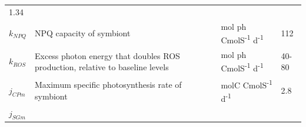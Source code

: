 \documentclass[]{elsarticle} %
\begin{document}
\begin{longtable}[c]{@{}llll@{}}
\begin{minipage}[t]{0.10\columnwidth}
1.34
\strut\end{minipage}\tabularnewline
\begin{minipage}[t]{0.10\columnwidth}\raggedright\strut
\(k_{NPQ}\)
\strut\end{minipage} &
\begin{minipage}[t]{0.48\columnwidth}\raggedright\strut
NPQ capacity of symbiont
\strut\end{minipage} &
\begin{minipage}[t]{0.25\columnwidth}\raggedright\strut
mol ph CmolS\textsuperscript{-1} d\textsuperscript{-1}
\strut\end{minipage} &
\begin{minipage}[t]{0.10\columnwidth}\raggedright\strut
112
\strut\end{minipage}\tabularnewline
\begin{minipage}[t]{0.10\columnwidth}\raggedright\strut
\(k_{ROS}\)
\strut\end{minipage} &
\begin{minipage}[t]{0.48\columnwidth}\raggedright\strut
Excess photon energy that doubles ROS production, relative to baseline
levels
\strut\end{minipage} &
\begin{minipage}[t]{0.25\columnwidth}\raggedright\strut
mol ph CmolS\textsuperscript{-1} d\textsuperscript{-1}
\strut\end{minipage} &
\begin{minipage}[t]{0.10\columnwidth}\raggedright\strut
40-80
\strut\end{minipage}\tabularnewline
\begin{minipage}[t]{0.10\columnwidth}\raggedright\strut
\(j_{CPm}\)
\strut\end{minipage} &
\begin{minipage}[t]{0.48\columnwidth}\raggedright\strut
Maximum specific photosynthesis rate of symbiont
\strut\end{minipage} &
\begin{minipage}[t]{0.25\columnwidth}\raggedright\strut
molC CmolS\textsuperscript{-1} d\textsuperscript{-1}
\strut\end{minipage} &
\begin{minipage}[t]{0.10\columnwidth}\raggedright\strut
2.8
\strut\end{minipage}\tabularnewline
\begin{minipage}[t]{0.10\columnwidth}\raggedright\strut
\(j_{SGm}\)
\strut\end{minipage} &
\begin{minipage}[t]{0.48\columnwidth}\raggedright\strut

\end{minipage}
\end{longtable}
\end{document}
